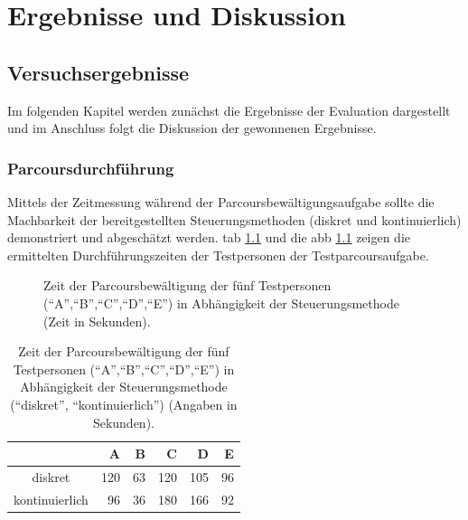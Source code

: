 
\chapter{Ergebnisse und Diskussion}
\label{chapter:ergebnisse}

\section{Versuchsergebnisse}
\label{section:versuchsergebnisse}

Im folgenden Kapitel werden zunächst die Ergebnisse der Evaluation dargestellt und im Anschluss folgt die Diskussion der gewonnenen Ergebnisse. 

\subsection{Parcoursdurchführung}
Mittels der Zeitmessung während der Parcoursbewältigungsaufgabe sollte die Machbarkeit der bereitgestellten Steuerungsmethoden (diskret und kontinuierlich) demonstriert und abgeschätzt werden. 
\acs{tab} \ref{tab:parcourzeit} und die \acs{abb} \ref{fig:parcourzeit} zeigen die ermittelten Durchführungszeiten der Testpersonen der Testparcoursaufgabe.

\begin{figure}[ht]
\begin{center}
\end{center}
\caption{Zeit der Parcoursbewältigung der fünf Testpersonen (\enquote{A},\enquote{B},\enquote{C},\enquote{D},\enquote{E}) in Abhängigkeit der Steuerungsmethode (Zeit in Sekunden).}
\label{fig:parcourzeit}
\end{figure}


\begin{table}[h]
\centering
\begin{tabular}{crrrrr}
  \hline
 & A & B & C & D & E \\ 
  \hline
diskret & 120 &  63 & 120 & 105 &  96 \\ 
  kontinuierlich &  96 &  36 & 180 & 166 &  92 \\ 
   \hline
\end{tabular}
\caption{Zeit der Parcoursbewältigung der fünf Testpersonen (\enquote{A},\enquote{B},\enquote{C},\enquote{D},\enquote{E}) in Abhängigkeit der Steuerungsmethode (\enquote{diskret}, \enquote{kontinuierlich}) (Angaben in Sekunden).} 
\label{tab:parcourzeit}
\end{table} 

